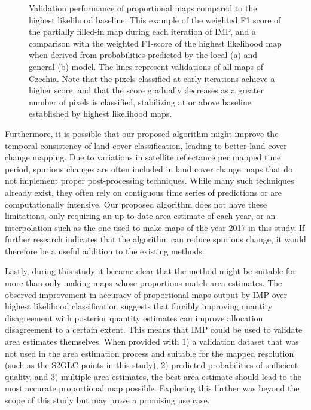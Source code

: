 \begin{figure}
\begin{subfigure}[b]{0.82\textwidth}
        \end{subfigure}
            \vspace*{-0.75cm}
            \caption{Validation performance of proportional maps compared to the highest likelihood baseline. This example of the weighted F1 score of the partially filled-in map during each iteration of IMP, and a comparison with the weighted F1-score of the highest likelihood map when derived from probabilities predicted by the local (a) and general (b) model. The lines represent validations of all maps of Czechia. Note that the pixels classified at early iterations achieve a higher score, and that the score gradually decreases as a greater number of pixels is classified, stabilizing at or above baseline established by highest likelihood maps.}
            \label{fig:f1_score_during_filling}
        \end{figure}
    
        Furthermore, it is possible that our proposed algorithm might improve the temporal consistency of land cover classification, leading to better land cover change mapping. Due to variations in satellite reflectance per mapped time period, spurious changes are often included in land cover change maps that do not implement proper post-processing techniques. While many such techniques already exist, they often rely on contiguous time series of predictions or are computationally intensive. Our proposed algorithm does not have these limitations, only requiring an up-to-date area estimate of each year, or an interpolation such as the one used to make maps of the year 2017 in this study. If further research indicates that the algorithm can reduce spurious change, it would therefore be a useful addition to the existing methods.
        
        Lastly, during this study it became clear that the method might be suitable for more than only making maps whose proportions match area estimates. The observed improvement in accuracy of proportional maps output by IMP over highest likelihood classification suggests that forcibly improving quantity disagreement with posterior quantity estimates can improve allocation disagreement to a certain extent. This means that IMP could be used to validate area estimates themselves. When provided with 1) a validation dataset that was not used in the area estimation process and suitable for the mapped resolution (such as the S2GLC points in this study), 2) predicted probabilities of sufficient quality, and 3) multiple area estimates, the best area estimate should lead to the most accurate proportional map possible. Exploring this further was beyond the scope of this study but may prove a promising use case.

